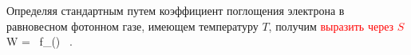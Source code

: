                                                       
%
%

Определяя стандартным путем коэффициент поглощения электрона в 
равновесном фотонном газе, имеющем температуру $T$, 
получим\textcolor{red}{ выразить через $S$}
%
\beq
\label{eq:w1}
W = \int {}
{\tau}\, 
f_\gamma(\omega)
  \, . 
\eeq

